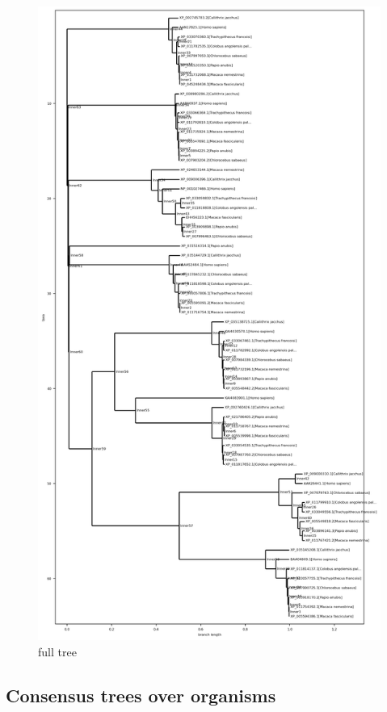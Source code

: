 \documentclass[a4paper, 12pt, one column]{article}
\begin{document}
\begin{figure}[H]
    \centering
    \includegraphics[width=.6\linewidth]{full_tree.png}
    \caption{full tree}
    \label{fig:full_tree.png}
\end{figure}  

\subsection{Consensus trees over organisms}
\end{document}
